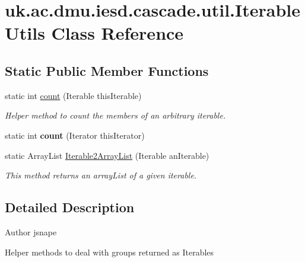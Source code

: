 \hypertarget{classuk_1_1ac_1_1dmu_1_1iesd_1_1cascade_1_1util_1_1_iterable_utils}{\section{uk.\-ac.\-dmu.\-iesd.\-cascade.\-util.\-Iterable\-Utils Class Reference}
\label{classuk_1_1ac_1_1dmu_1_1iesd_1_1cascade_1_1util_1_1_iterable_utils}
}
\subsection*{Static Public Member Functions}
\begin{DoxyCompactItemize}
\item 
static int \hyperlink{classuk_1_1ac_1_1dmu_1_1iesd_1_1cascade_1_1util_1_1_iterable_utils_a832fe9ba0e8a7cbfda1adca485c0881e}{count} (Iterable this\-Iterable)
\begin{DoxyCompactList}\small\item\em Helper method to count the members of an arbitrary iterable. \end{DoxyCompactList}\item 
\hypertarget{classuk_1_1ac_1_1dmu_1_1iesd_1_1cascade_1_1util_1_1_iterable_utils_a7612ce4d7bc28df364dadc916d8c5d6b}{static int {\bfseries count} (Iterator this\-Iterator)}\label{classuk_1_1ac_1_1dmu_1_1iesd_1_1cascade_1_1util_1_1_iterable_utils_a7612ce4d7bc28df364dadc916d8c5d6b}

\item 
static Array\-List \hyperlink{classuk_1_1ac_1_1dmu_1_1iesd_1_1cascade_1_1util_1_1_iterable_utils_a19904763c2ff1498278df1f2ccd9ef96}{Iterable2\-Array\-List} (Iterable an\-Iterable)
\begin{DoxyCompactList}\small\item\em This method returns an array\-List of a given iterable. \end{DoxyCompactList}\end{DoxyCompactItemize}


\subsection{Detailed Description}
\begin{DoxyAuthor}{Author}
jsnape
\end{DoxyAuthor}
Helper methods to deal with groups returned as Iterables 

